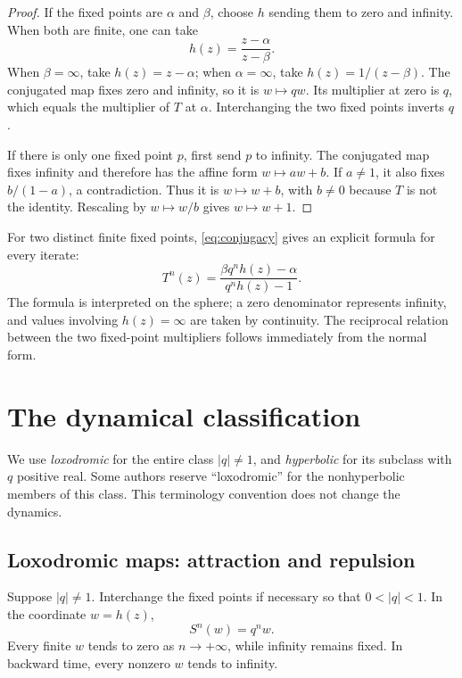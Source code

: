 \documentclass[11pt,a4paper]{article}
\newcommand{\abs}[1]{\left|#1\right|}
\theoremstyle{plain}
\theoremstyle{definition}
\theoremstyle{remark}
\begin{document}
\begin{proof}
If the fixed points are $\alpha$ and $\beta$, choose $h$ sending them to
zero and infinity. When both are finite, one can take
\begin{equation}\label{eq:h}
  h(z)=\frac{z-\alpha}{z-\beta}.
\end{equation}
When $\beta=\infty$, take $h(z)=z-\alpha$; when $\alpha=\infty$,
take $h(z)=1/(z-\beta)$. The conjugated map fixes zero and infinity,
so it is $w\mapsto qw$. Its multiplier at zero is $q$, which equals
the multiplier of $T$ at $\alpha$. Interchanging the two fixed points
inverts $q$.

If there is only one fixed point $p$, first send $p$ to infinity.
The conjugated map fixes infinity and therefore has the affine form
$w\mapsto aw+b$. If $a\ne1$, it also fixes $b/(1-a)$, a contradiction.
Thus it is $w\mapsto w+b$, with $b\ne0$ because $T$ is not the identity.
Rescaling by $w\mapsto w/b$ gives $w\mapsto w+1$.
\end{proof}

For two distinct finite fixed points, \eqref{eq:conjugacy} gives an explicit
formula for every iterate:
\begin{equation}\label{eq:iterate}
  T^n(z)=\frac{\beta q^n h(z)-\alpha}{q^n h(z)-1}.
\end{equation}
The formula is interpreted on the sphere; a zero denominator represents
infinity, and values involving $h(z)=\infty$ are taken by continuity.
The reciprocal relation between the two fixed-point multipliers follows
immediately from the normal form.

\section{The dynamical classification}

We use \emph{loxodromic} for the entire class $\abs{q}\ne1$, and
\emph{hyperbolic} for its subclass with $q$ positive real. Some authors
reserve ``loxodromic'' for the nonhyperbolic members of this class.
This terminology convention does not change the dynamics.

\subsection{Loxodromic maps: attraction and repulsion}

Suppose $\abs{q}\ne1$. Interchange the fixed points if necessary so that
$0<\abs{q}<1$. In the coordinate $w=h(z)$,
\[
  S^n(w)=q^n w.
\]
Every finite $w$ tends to zero as $n\to+\infty$, while infinity remains
fixed. In backward time, every nonzero $w$ tends to infinity.
\end{document}
